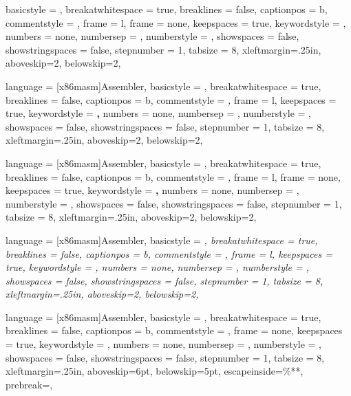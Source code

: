
{
    basicstyle = \ttfamily,
    breakatwhitespace = true,
    breaklines = false,
    captionpos = b,
    commentstyle = \textit,
    frame = l,
    frame = none,
    keepspaces = true,
    keywordstyle = \mdseries,
    numbers = none,
    numbersep = \parindent,
    numberstyle = \tiny,
    showspaces = false,
    showstringspaces = false,
    stepnumber = 1,
    tabsize = 8,
    xleftmargin=.25in,
    aboveskip=2\medskipamount,
    belowskip=2\medskipamount,
}

{
    language = {[x86masm]Assembler},
    basicstyle = \ttfamily,
    breakatwhitespace = true,
    breaklines = false,
    captionpos = b,
    commentstyle = \textit,
    frame = l,
    keepspaces = true,
    keywordstyle = \textbf,
    numbers = none,
    numbersep = \parindent,
    numberstyle = \tiny,
    showspaces = false,
    showstringspaces = false,
    stepnumber = 1,
    tabsize = 8,
    xleftmargin=.25in,
    aboveskip=2\medskipamount,
    belowskip=2\medskipamount,
}

{
    language = {[x86masm]Assembler},
    basicstyle = \ttfamily,
    breakatwhitespace = true,
    breaklines = false,
    captionpos = b,
    commentstyle = \textit,
    frame = l,
    frame = none,
    keepspaces = true,
    keywordstyle = \textbf,
    numbers = none,
    numbersep = \parindent,
    numberstyle = \tiny,
    showspaces = false,
    showstringspaces = false,
    stepnumber = 1,
    tabsize = 8,
    xleftmargin=.25in,
    aboveskip=2\medskipamount,
    belowskip=2\medskipamount,
}

{
    language = {[x86masm]Assembler},
    basicstyle = \ttfamily\itshape,
    breakatwhitespace = true,
    breaklines = false,
    captionpos = b,
    commentstyle = ,
    frame = l,
    keepspaces = true,
    keywordstyle = ,
    numbers = none,
    numbersep = \parindent,
    numberstyle = ,
    showspaces = false,
    showstringspaces = false,
    stepnumber = 1,
    tabsize = 8,
    xleftmargin=.25in,
    aboveskip=2\medskipamount,
    belowskip=2\medskipamount,
}

{
    language = {[x86masm]Assembler},
    basicstyle = \ttfamily,
    breakatwhitespace = true,
    breaklines = false,
    captionpos = b,
    commentstyle = ,
    frame = none,
    keepspaces = true,
    keywordstyle = ,
    numbers = none,
    numbersep = \parindent,
    numberstyle = ,
    showspaces = false,
    showstringspaces = false,
    stepnumber = 1,
    tabsize = 8,
    xleftmargin=.25in,
    aboveskip=6pt,
    belowskip=5pt,
    escapeinside={\%*}{*},
    prebreak=,
}

